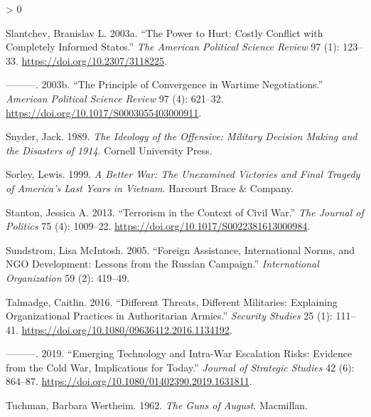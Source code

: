 \documentclass[
]{article}
\newlength{\cslhangindent}
\newenvironment{CSLReferences}[2] %
 {%
  \setlength{\parindent}{0pt}
  \ifodd #1 \everypar{\setlength{\hangindent}{\cslhangindent}}\ignorespaces\fi
  \ifnum #2 > 0
  \setlength{\parskip}{#2\baselineskip}
  \fi
 }%
 {}
\begin{document}
\begin{CSLReferences}{1}{0}
\leavevmode\hypertarget{ref-slantchev_powerhurtcostly_2003}{}%
Slantchev, Branislav L. 2003a. {``The {Power} to {Hurt}: {Costly Conflict} with {Completely Informed States}.''} \emph{The American Political Science Review} 97 (1): 123--33. \url{https://doi.org/10.2307/3118225}.

\leavevmode\hypertarget{ref-slantchev_principleconvergencewartime_2003}{}%
---------. 2003b. {``The {Principle} of {Convergence} in {Wartime Negotiations}.''} \emph{American Political Science Review} 97 (4): 621--32. \url{https://doi.org/10.1017/S0003055403000911}.

\leavevmode\hypertarget{ref-snyder_ideologyoffensivemilitary_1989}{}%
Snyder, Jack. 1989. \emph{The {Ideology} of the {Offensive}: {Military Decision Making} and the {Disasters} of 1914}. {Cornell University Press}.

\leavevmode\hypertarget{ref-sorley_betterwarunexamined_1999}{}%
Sorley, Lewis. 1999. \emph{A {Better War}: {The Unexamined Victories} and {Final Tragedy} of {America}'s {Last Years} in {Vietnam}}. {Harcourt Brace \& Company}.

\leavevmode\hypertarget{ref-stanton_terrorismcontextcivil_2013}{}%
Stanton, Jessica A. 2013. {``Terrorism in the {Context} of {Civil War}.''} \emph{The Journal of Politics} 75 (4): 1009--22. \url{https://doi.org/10.1017/S0022381613000984}.

\leavevmode\hypertarget{ref-sundstrom_foreignassistanceinternational_2005}{}%
Sundstrom, Lisa McIntosh. 2005. {``Foreign {Assistance}, {International Norms}, and {NGO Development}: {Lessons} from the {Russian Campaign}.''} \emph{International Organization} 59 (2): 419--49.

\leavevmode\hypertarget{ref-talmadge_differentthreatsdifferent_2016}{}%
Talmadge, Caitlin. 2016. {``Different {Threats}, {Different Militaries}: {Explaining Organizational Practices} in {Authoritarian Armies}.''} \emph{Security Studies} 25 (1): 111--41. \url{https://doi.org/10.1080/09636412.2016.1134192}.

\leavevmode\hypertarget{ref-talmadge_emergingtechnologyintrawar_2019}{}%
---------. 2019. {``Emerging Technology and Intra-War Escalation Risks: {Evidence} from the {Cold War}, Implications for Today.''} \emph{Journal of Strategic Studies} 42 (6): 864--87. \url{https://doi.org/10.1080/01402390.2019.1631811}.

\leavevmode\hypertarget{ref-tuchman_gunsaugust_1962}{}%
Tuchman, Barbara Wertheim. 1962. \emph{The {Guns} of {August}}. {Macmillan}.


\end{CSLReferences}
\end{document}
